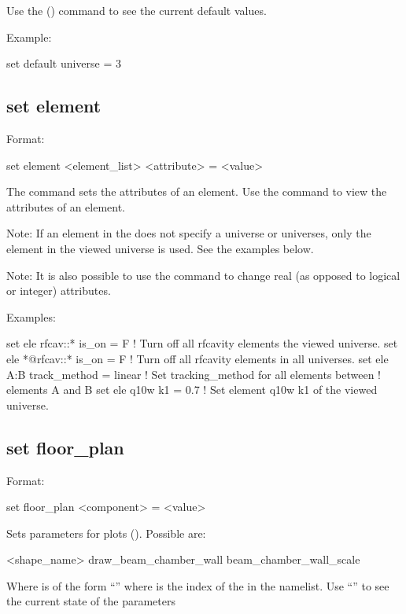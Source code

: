 {{Use the  () command to see the current
default values.

Example:
\begin{example}
  set default universe = 3
\end{example}


\subsection{set element}
\label{s:set.element}

Format:
\begin{example}
  set element <element_list> <attribute> = <value>
\end{example}

The  command sets the attributes of an element. Use the 
command to view the attributes of an element.

Note: If an element in the  does not specify a universe or universes,
only the element in the viewed universe is used. See the examples below.

Note: It is also possible to use the  command to change
real (as opposed to logical or integer) attributes.

Examples:
\begin{example}
  set ele rfcav::* is_on = F        ! Turn off all rfcavity elements the viewed universe.
  set ele *@rfcav::* is_on = F      ! Turn off all rfcavity elements in all universes.
  set ele A:B track_method = linear ! Set tracking_method for all elements between 
                                    !   elements A and B
  set ele q10w k1 = 0.7             ! Set element q10w k1 of the viewed universe.
\end{example}


\subsection{set floor_plan}
\label{s:set.floor.plan}

Format:
\begin{example}
  set floor_plan <component> = <value>
\end{example}


Sets parameters for  plots ().  Possible
 are:
\begin{example}
  <shape_name>%
  draw_beam_chamber_wall
  beam_chamber_wall_scale
\end{example}
Where  is of the form ``'' where  is the index
of the  in the  namelist.  Use ``'' to see the current state of the  parameters

}}
